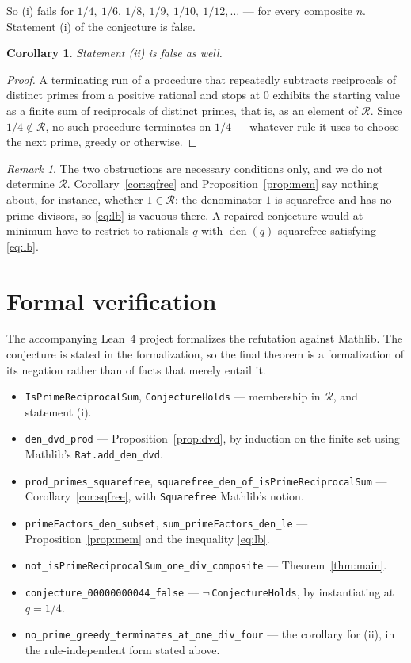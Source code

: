 \documentclass[11pt]{article}
\theoremstyle{plain}
\newtheorem{corollary}[theorem]{Corollary}
\theoremstyle{remark}
\newtheorem{remark}[theorem]{Remark}
\begin{document}
So (i) fails for $1/4,\ 1/6,\ 1/8,\ 1/9,\ 1/10,\ 1/12,\dots$ --- for every
composite $n$. Statement (i) of the conjecture is false.

\begin{corollary}
Statement (ii) is false as well.
\end{corollary}

\begin{proof}
A terminating run of a procedure that repeatedly subtracts reciprocals of
distinct primes from a positive rational and stops at $0$ exhibits the starting
value as a finite sum of reciprocals of distinct primes, that is, as an element
of $\mathcal R$. Since $1/4\notin\mathcal R$, no such procedure terminates on
$1/4$ --- whatever rule it uses to choose the next prime, greedy or otherwise.
\end{proof}

\begin{remark}
The two obstructions are necessary conditions only, and we do not determine
$\mathcal R$. Corollary~\ref{cor:sqfree} and Proposition~\ref{prop:mem} say
nothing about, for instance, whether $1\in\mathcal R$: the denominator $1$ is
squarefree and has no prime divisors, so \eqref{eq:lb} is vacuous there. A
repaired conjecture would at minimum have to restrict to rationals $q$ with
$\operatorname{den}(q)$ squarefree satisfying \eqref{eq:lb}.
\end{remark}

\section{Formal verification}

The accompanying Lean~4 project formalizes the refutation against Mathlib. The
conjecture is stated in the formalization, so the final theorem is a
formalization of its negation rather than of facts that merely entail it.

\begin{itemize}
  \item \texttt{IsPrimeReciprocalSum}, \texttt{ConjectureHolds} --- membership
    in $\mathcal R$, and statement (i).
  \item \texttt{den\_dvd\_prod} --- Proposition~\ref{prop:dvd}, by induction on
    the finite set using Mathlib's \texttt{Rat.add\_den\_dvd}.
  \item \texttt{prod\_primes\_squarefree},
    \texttt{squarefree\_den\_of\_isPrimeReciprocalSum} ---
    Corollary~\ref{cor:sqfree}, with \texttt{Squarefree} Mathlib's notion.
  \item \texttt{primeFactors\_den\_subset}, \texttt{sum\_primeFactors\_den\_le}
    --- Proposition~\ref{prop:mem} and the inequality \eqref{eq:lb}.
  \item \texttt{not\_isPrimeReciprocalSum\_one\_div\_composite} ---
    Theorem~\ref{thm:main}.
  \item \texttt{conjecture\_00000000044\_false} ---
    $\lnot$\,\texttt{ConjectureHolds}, by instantiating at $q=1/4$.
  \item \texttt{no\_prime\_greedy\_terminates\_at\_one\_div\_four} --- the
    corollary for (ii), in the rule-independent form stated above.
\end{itemize}
\end{document}
